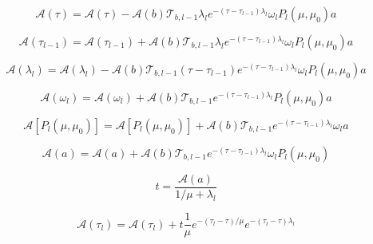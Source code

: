 \begin{equation}
\mathcal{A}(\tau) = \mathcal{A}(\tau) - \mathcal{A}(b) \mathcal{T}_{b,l-1} \lambda_{l} e^{-(\tau - \tau_{l-1})\lambda_{l}} \omega_{l} P_{l}(\mu, \mu_0) a
\label{eq:single_scattering-adjoint_of_tangent_linear-up-tau_a2}
\end{equation}

\begin{equation}
\mathcal{A}(\tau_{l-1}) = \mathcal{A}(\tau_{l-1}) + \mathcal{A}(b) \mathcal{T}_{b,l-1} \lambda_{l} e^{-(\tau - \tau_{l-1})\lambda_{l}} \omega_{l} P_{l}(\mu, \mu_0) a
\label{eq:single_scattering-adjoint_of_tangent_linear-up-tau_l_m_1_a2}
\end{equation}

\begin{equation}
\mathcal{A}(\lambda_{l}) = \mathcal{A}(\lambda_{l}) - \mathcal{A}(b) \mathcal{T}_{b,l-1} (\tau - \tau_{l-1}) e^{-(\tau - \tau_{l-1})\lambda_{l}} \omega_{l} P_{l}(\mu, \mu_0) a
\label{eq:single_scattering-adjoint_of_tangent_linear-up-lambda_l_a2}
\end{equation}

\begin{equation}
\mathcal{A}(\omega_{l}) = \mathcal{A}(\omega_{l}) + \mathcal{A}(b) \mathcal{T}_{b,l-1} e^{-(\tau - \tau_{l-1})\lambda_{l}} P_{l}(\mu, \mu_0) a
\label{eq:single_scattering-adjoint_of_tangent_linear-up-omega_l_a}
\end{equation}

\begin{equation}
\mathcal{A}\left[P_{l}(\mu, \mu_0)\right] = \mathcal{A}\left[P_{l}(\mu, \mu_0)\right] + \mathcal{A}(b) \mathcal{T}_{b,l-1} e^{-(\tau - \tau_{l-1})\lambda_{l}} \omega_{l} a
\label{eq:single_scattering-adjoint_of_tangent_linear-up-P_l_a}
\end{equation}

\begin{equation}
\mathcal{A}(a) = \mathcal{A}(a) + \mathcal{A}(b) \mathcal{T}_{b,l-1} e^{-(\tau - \tau_{l-1})\lambda_{l}} \omega_{l} P_{l}(\mu, \mu_0)
\label{eq:single_scattering-adjoint_of_tangent_linear-up-a_a}
\end{equation}

\begin{equation}
t = \frac{\mathcal{A}(a)}{1 / \mu + \lambda_{l}}
\label{eq:single_scattering-adjoint_of_tangent_linear-up-t}
\end{equation}

\begin{equation}
\mathcal{A}(\tau_{l}) = \mathcal{A}(\tau_{l}) + t \frac{1}{\mu} e^{-(\tau_{l} - \tau) / \mu} e^{-(\tau_{l} - \tau) \lambda_{l}}
\label{eq:single_scattering-adjoint_of_tangent_linear-up-tau_l_a2}
\end{equation}

